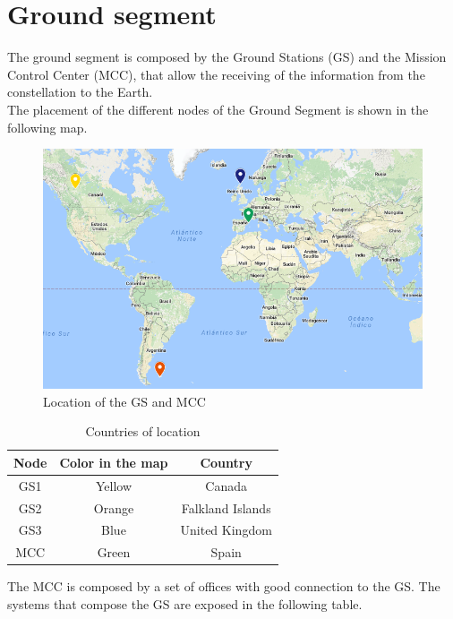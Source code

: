 \section{Ground segment}
The ground segment is composed by the Ground Stations (GS) and the Mission Control Center (MCC), that allow the receiving of the information from the constellation to the Earth.\\
The placement of the different nodes of the Ground Segment is shown in the following map.  
\begin{figure}[H]
\begin{center}
\includegraphics[scale=0.6]{map.PNG} 
\caption{Location of the GS and MCC}
\end{center}
\end{figure}
\begin{table}[H]
\begin{center}
\begin{tabular}{|c|c|c|}
\hline
\rowcolor{blue} \textbf{Node}&\textbf{Color in the map}&\textbf{Country}\\
\hline
GS1&Yellow&Canada\\
\hline
GS2&Orange&Falkland Islands\\
\hline
GS3&Blue&United Kingdom\\
\hline
MCC&Green&Spain\\
\hline
\end{tabular}
\caption{Countries of location}
\end{center}
\end{table}
The MCC is composed by a set of offices with good connection to the GS. The systems that compose the GS are exposed in the following table. 
